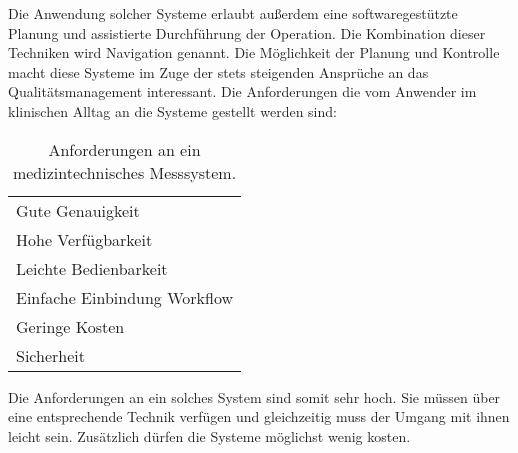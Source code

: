 Die Anwendung solcher Systeme erlaubt außerdem eine softwaregestützte Planung und assistierte Durchführung der Operation. Die Kombination dieser Techniken wird Navigation genannt. Die Möglichkeit der Planung und Kontrolle macht diese Systeme im Zuge der stets steigenden Ansprüche an das Qualitätsmanagement interessant. Die Anforderungen die vom Anwender im klinischen Alltag an die Systeme gestellt werden sind:
%
\begin{table} [H]
	\begin{center}
		\begin{tabular}{l}
		Gute Genauigkeit\\
		Hohe Verfügbarkeit\\
		Leichte Bedienbarkeit\\
		Einfache Einbindung Workflow\\
		Geringe Kosten\\
		Sicherheit\\
		\end{tabular}
	\end{center}
	\caption[Anforderungen Trackingsysteme]{Anforderungen an ein medizintechnisches Messsystem.}
	\label{tab:requirements_system}
\end{table}
%
Die Anforderungen an ein solches System sind somit sehr hoch. Sie müssen über eine entsprechende Technik verfügen und gleichzeitig muss der Umgang mit ihnen leicht sein. Zusätzlich dürfen die Systeme möglichst wenig kosten.\\
%
